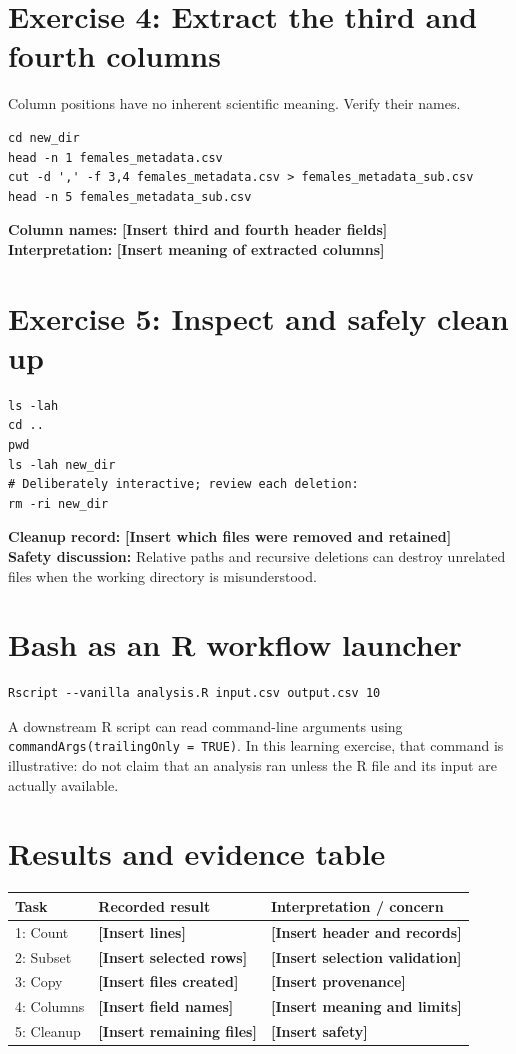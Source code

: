 \documentclass[11pt,letterpaper]{article}
\newcommand{\fillin}[1]{\textbf{[Insert #1]}}
\begin{document}
\section{Exercise 4: Extract the third and fourth columns}
Column positions have no inherent scientific meaning. Verify their names.
\begin{lstlisting}
cd new_dir
head -n 1 females_metadata.csv
cut -d ',' -f 3,4 females_metadata.csv > females_metadata_sub.csv
head -n 5 females_metadata_sub.csv
\end{lstlisting}
\noindent\textbf{Column names:} \fillin{third and fourth header fields}\\
\textbf{Interpretation:} \fillin{meaning of extracted columns}

\section{Exercise 5: Inspect and safely clean up}
\begin{lstlisting}
ls -lah
cd ..
pwd
ls -lah new_dir
# Deliberately interactive; review each deletion:
rm -ri new_dir
\end{lstlisting}
\noindent\textbf{Cleanup record:} \fillin{which files were removed and retained}\\
\textbf{Safety discussion:} Relative paths and recursive deletions can
destroy unrelated files when the working directory is misunderstood.

\section{Bash as an R workflow launcher}
\begin{lstlisting}
Rscript --vanilla analysis.R input.csv output.csv 10
\end{lstlisting}
A downstream R script can read command-line arguments using
\texttt{commandArgs(trailingOnly = TRUE)}. In this learning exercise, that
command is illustrative: do not claim that an analysis ran unless the R file
and its input are actually available.

\section{Results and evidence table}
\begin{tabular}{p{.23\linewidth}p{.37\linewidth}p{.30\linewidth}}
\toprule
Task & Recorded result & Interpretation / concern\\ \midrule
1: Count & \fillin{lines} & \fillin{header and records}\\
2: Subset & \fillin{selected rows} & \fillin{selection validation}\\
3: Copy & \fillin{files created} & \fillin{provenance}\\
4: Columns & \fillin{field names} & \fillin{meaning and limits}\\
5: Cleanup & \fillin{remaining files} & \fillin{safety}\\
\bottomrule
\end{tabular}
\end{document}
